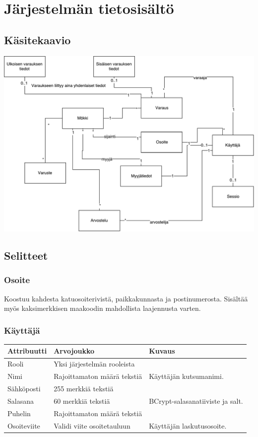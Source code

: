 \chapter{Järjestelmän tietosisältö}
\section{Käsitekaavio}

\includegraphics[width = 14cm]{./diagrams/drawio_entities.pdf}
\newpage
\section{Selitteet}

\subsection{Osoite}
Koostuu kahdesta katuosoiterivistä, paikkakunnasta ja postinumerosta. Sisältää myös kaksimerkkisen maakoodin mahdollista laajennusta varten.

\subsection{Käyttäjä}
\begin{tabular}{|l|l|l|}
	\hline
	Attribuutti & Arvojoukko & Kuvaus \\ \hline
	Rooli & Yksi järjestelmän rooleista & \\ \hline
	Nimi & Rajoittamaton määrä tekstiä & Käyttäjän kutsumanimi. \\ \hline
	Sähköposti & 255 merkkiä tekstiä & \\ \hline
	Salasana & 60 merkkiä tekstiä & BCrypt-salasanatiiviste ja salt. \\ \hline
	Puhelin & Rajoittamaton määrä tekstiä & \\ \hline
	Osoiteviite & Validi viite osoitetauluun & Käyttäjän laskutusosoite. \\ \hline
\end{tabular}

